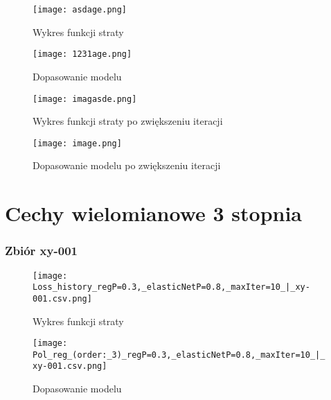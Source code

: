 \documentclass{article}
\begin{document}
\begin{figure}[H]
    \centering
    \begin{minipage}{0.45\textwidth}
        \texttt{[image: asdage.png]}
        \caption{Wykres funkcji straty}
    \end{minipage}
    \hfill
    \begin{minipage}{0.45\textwidth}
        \texttt{[image: 1231age.png]}
        \caption{Dopasowanie modelu}
    \end{minipage}
\end{figure}

\begin{figure}[H]
    \centering
    \begin{minipage}{0.45\textwidth}
        \texttt{[image: imagasde.png]}
        \caption{Wykres funkcji straty po zwiększeniu iteracji}
    \end{minipage}
    \hfill
    \begin{minipage}{0.45\textwidth}
        \texttt{[image: image.png]}
        \caption{Dopasowanie modelu po zwiększeniu iteracji}
    \end{minipage}
\end{figure}

\section{Cechy wielomianowe 3 stopnia}

\subsubsection{Zbiór xy-001}
\begin{figure}[H]
    \centering
    \begin{minipage}{0.45\textwidth}
        \texttt{[image: Loss\_history\_regP=0.3,\_elasticNetP=0.8,\_maxIter=10\_|\_xy-001.csv.png]}
        \caption{Wykres funkcji straty}
    \end{minipage}
    \hfill
    \begin{minipage}{0.45\textwidth}
        \texttt{[image: Pol\_reg\_(order:\_3)\_regP=0.3,\_elasticNetP=0.8,\_maxIter=10\_|\_xy-001.csv.png]}
        \caption{Dopasowanie modelu}
    \end{minipage}
\end{figure}
\end{document}
